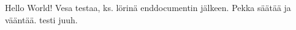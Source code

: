 \documentclass{article}
\begin{document}
Hello World!
Vesa testaa, ks. lörinä enddocumentin jälkeen.
Pekka säätää ja vääntää. testi
juuh.
\end{document}
